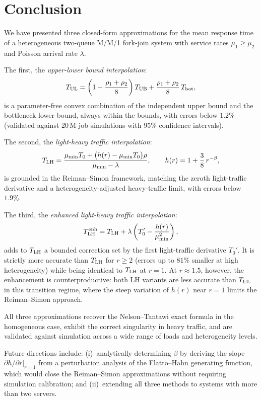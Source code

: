 \section{Conclusion}
\label{sec:conclusion}

We have presented three closed-form approximations for the mean response time
of a heterogeneous two-queue M/M/1 fork-join system with service rates
$\mu_1 \geq \mu_2$ and Poisson arrival rate $\lambda$.

The first, the \emph{upper-lower bound interpolation}:
\begin{equation}
  T_{\text{UL}} = \left(1 - \frac{\rho_1+\rho_2}{8}\right)T_{\text{UB}}
          + \frac{\rho_1+\rho_2}{8}\,T_{\text{bot}},
\end{equation}
is a parameter-free convex combination of the independent upper bound and
the bottleneck lower bound, always within the bounds, with errors below $1.2\%$
(validated against 20\,M-job simulations with 95\% confidence intervals).

The second, the \emph{light-heavy traffic interpolation}:
\begin{equation}
  T_{\text{LH}} = \frac{\mu_{\min} T_0 + \bigl(h(r) - \mu_{\min} T_0\bigr)\rho}
              {\mu_{\min} - \lambda},
  \qquad h(r) = 1 + \frac{3}{8}\,r^{-\beta},
\end{equation}
is grounded in the Reiman--Simon framework, matching the zeroth light-traffic
derivative and a heterogeneity-adjusted heavy-traffic limit, with errors
below $1.9\%$.

The third, the \emph{enhanced light-heavy traffic interpolation}:
\begin{equation}
  T_{\text{LH}}^{\text{enh}} = T_{\text{LH}} + \lambda\left(T_0' - \frac{h(r)}{\mu_{\min}^2}\right),
\end{equation}
adds to $T_{\text{LH}}$ a bounded correction set by the first light-traffic
derivative $T_0'$.
It is strictly more accurate than $T_{\text{LH}}$ for $r \geq 2$ (errors up to
$81\%$ smaller at high heterogeneity) while being identical to $T_{\text{LH}}$ at
$r = 1$.
At $r \approx 1.5$, however, the enhancement is counterproductive: both LH
variants are less accurate than $T_{\text{UL}}$ in this transition regime, where the
steep variation of $h(r)$ near $r = 1$ limits the Reiman--Simon approach.

All three approximations recover the Nelson--Tantawi exact formula in the
homogeneous case, exhibit the correct singularity in heavy traffic, and are
validated against simulation across a wide range of loads and
heterogeneity levels.

Future directions include: (i)~analytically determining $\beta$ by
deriving the slope $\partial h/\partial r|_{r=1}$ from a perturbation
analysis of the Flatto--Hahn generating function, which would close the
Reiman--Simon approximations without requiring simulation calibration; and
(ii)~extending all three methods to systems with more than two servers.
